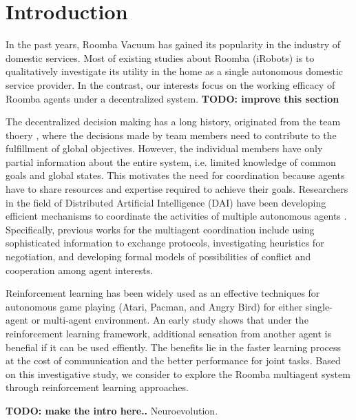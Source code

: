 \documentclass[conference]{IEEEtran}
\begin{document}
\section{Introduction}
In the past years, Roomba Vacuum has gained its popularity in the industry of
domestic services.  Most of existing studies about Roomba (iRobots) is to 
qualitatively investigate its utility in the home as a single autonomous
domestic service provider. In the contrast, our interests focus on the working
efficacy of Roomba agents under a decentralized system. 
\textbf{TODO: improve this section}

The decentralized decision making has a long history, originated from the team
thoery \cite{marschak1955elements, radner1962team,
    radner1959application, ho1972team, tsitsiklis1985complexity},
where the decisions made by team members need to contribute to the fulfillment
of global objectives. However, the individual members have only partial
information about the entire system, i.e. limited knowledge of common goals
and global states. This motivates the need for coordination because agents
have to share resources and expertise required to achieve their goals.
Researchers in the field of Distributed Artificial Intelligence (DAI) have
been developing efficient mechanisms to coordinate the activities of multiple
autonomous agents \cite{weiss1999multiagent, huhns2012distributed}. 
Specifically, previous works for the multiagent coordination 
include using sophisticated information to exchange protocols, investigating
heuristics for negotiation, and developing formal models of possibilities of
conflict and cooperation among agent interests. 

Reinforcement learning has been widely used as an effective techniques for
autonomous game playing (Atari, Pacman, and Angry Bird) for either
single-agent or multi-agent environment. 
An early study \cite{tan1993multi} shows that under the reinforcement learning
framework, additional sensation from another agent is benefial if it
can be used effiently. The benefits lie in the faster learning process at the
cost of communication and the better performance for joint tasks.  
Based on this investigative study, we consider to explore the Roomba
multiagent system through reinforcement learning approaches.

\textbf{TODO: make the intro here..}
Neuroevolution.
\end{document}
